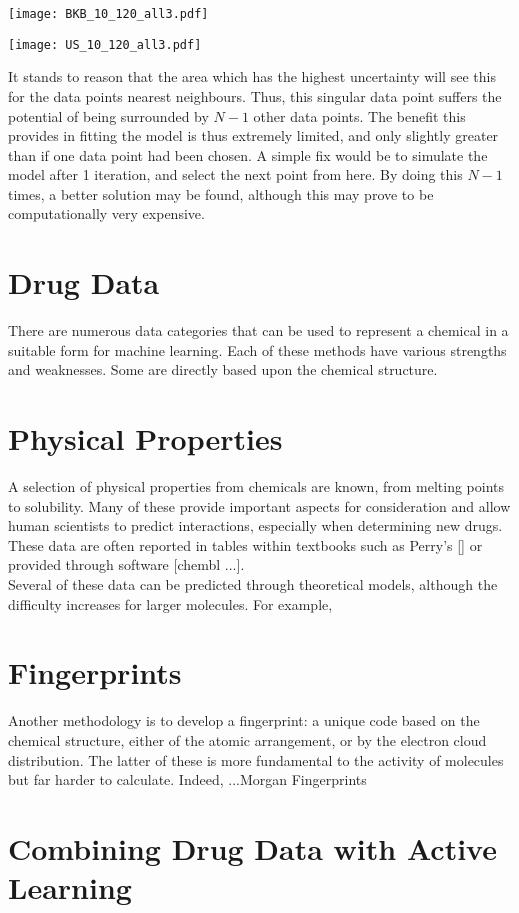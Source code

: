 \begin{center}
  \texttt{[image: BKB\_10\_120\_all3.pdf]}
\end{center}
\begin{center}
  \texttt{[image: US\_10\_120\_all3.pdf]}
\end{center}

It stands to reason that the area which has the highest uncertainty will see this for the data points nearest neighbours. Thus, this singular data point suffers the potential of being surrounded by $N-1$ other data points. The benefit this provides in fitting the model is thus extremely limited, and only slightly greater than if one data point had been chosen. A simple fix would be to simulate the model after 1 iteration, and select the next point from here. By doing this $N-1$ times, a better solution may be found, although this may prove to be computationally very expensive.

\section{Drug Data}
There are numerous data categories that can be used to represent a chemical in a suitable form for machine learning. Each of these methods have various strengths and weaknesses. Some are directly based upon the chemical structure.
\section{Physical Properties}
A selection of physical properties from chemicals are known, from melting points to solubility. Many of these provide important aspects for consideration and allow human scientists to predict interactions, especially when determining new drugs. These data are often reported in tables within textbooks such as Perry's [] or provided through software [chembl ...].
\\
Several of these data can be predicted through theoretical models, although the difficulty increases for larger molecules. For example,
\blindtext[1]
\section{Fingerprints}
Another methodology is to develop a fingerprint: a unique code based on the chemical structure, either of the atomic arrangement, or by the electron cloud distribution. The latter of these is more fundamental to the activity of molecules but far harder to calculate. Indeed,
...Morgan Fingerprints
\blindtext[1]
\section{Combining Drug Data with Active Learning}
\blindtext[1]